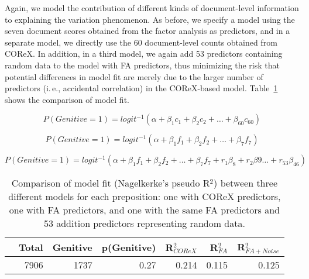 Again, we model the contribution of different kinds of document-level information to explaining the variation phenomenon. As before, we specify a model using the seven document scores obtained from the factor analysis as predictors, and in a separate model, we directly use the 60 document-level counts obtained from COReX. In addition, in a third model, we again add 53 predictors containing random data to the model with FA predictors, thus minimizing the risk that potential differences in model fit are merely due to the larger number of predictors (i.\,e., accidental correlation) in the COReX-based model. Table~\ref{mn-results} shows the comparison of model fit.

 
\begin{equation}
\label{mn-glm-allpreps-corex}
  P(Genitive=1) = logit^{-1}(\alpha + \beta_1 c_1 + \beta_2 c_2 + \dots + \beta_{60} c_{60})
\end{equation}



\begin{equation}
\label{mn-glm-allpreps-fa}
  P(Genitive=1) = logit^{-1}(\alpha + \beta_1 f_1 + \beta_2 f_2 + \dots + \beta_{7} f_{7})
\end{equation}


\begin{equation}
\label{mn-glm-allpreps-fa-rr}
  P(Genitive=1) = logit^{-1}(\alpha + \beta_1 f_1 + \beta_2 f_2 + \dots + \beta_{7} f_{7} + r_1 \beta_8 + r_2 \beta9 \ldots + r_{53} \beta_{46})
\end{equation}


\begin{table}
  \begin{tabular}{lrrrrrr}
  \toprule
             & Total  & Genitive & p(Genitive) & R$^2_{COReX}$ & R$^2_{FA}$ & R$^2_{FA+Noise}$\\
  \midrule
            & 7906   & 1737   & 0.27    & 0.214   & 0.115  & 0.125\\
%  
  \bottomrule
  \end{tabular}
  \caption{Comparison of model fit (Nagelkerke's pseudo R$^2$) between three different models for each preposition: one with COReX predictors, one with FA predictors, and one with the same FA predictors and 53 addition predictors representing random data.}\label{mn-results}
\end{table}
%


